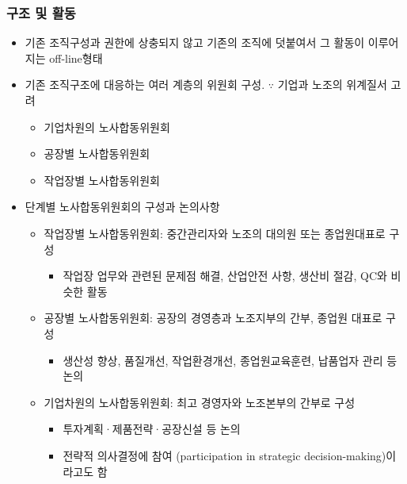 \documentclass[aspectratio=169,xcolor=dvipsnames,handout]{beamer}
\begin{document}
\begin{frame}[allowframebreaks]
    \frametitle{구조 및 활동}
    \begin{itemize}[<+->]
        \item 기존 조직구성과 권한에 상충되지 않고 기존의 조직에 덧붙여서 그 활동이 이루어지는 off-line형태
        \item 기존 조직구조에 대응하는 여러 계층의 위원회 구성. $\because$ 기업과 노조의 위계질서 고려
        \begin{itemize}[<+->]
            \item 기업차원의 노사합동위원회
            \item 공장별 노사합동위원회
            \item 작업장별 노사합동위원회
        \end{itemize}
    \framebreak\relax
        \item  단계별 노사합동위원회의 구성과 논의사항
        \begin{itemize}[<+->]
            \item 작업장별 노사합동위원회: 중간관리자와 노조의 대의원 또는 종업원대표로 구성
            \begin{itemize}[<+->]
                \item 작업장 업무와 관련된 문제점 해결, 산업안전 사항, 생산비 절감, QC와 비슷한 활동
            \end{itemize}
        \item 공장별 노사합동위원회: 공장의 경영층과 노조지부의 간부, 종업원 대표로 구성
            \begin{itemize}[<+->]
                \item 생산성 향상, 품질개선, 작업환경개선, 종업원교육훈련, 납품업자 관리 등 논의
            \end{itemize}
        \item 기업차원의 노사합동위원회: 최고 경영자와 노조본부의 간부로 구성
            \begin{itemize}[<+->]
                \item 투자계획·제품전략·공장신설 등 논의
                \item 전략적 의사결정에 참여 (participation in strategic decision-making)이라고도 함
            \end{itemize}
        \end{itemize}
    \end{itemize}
\end{frame}
\end{document}
